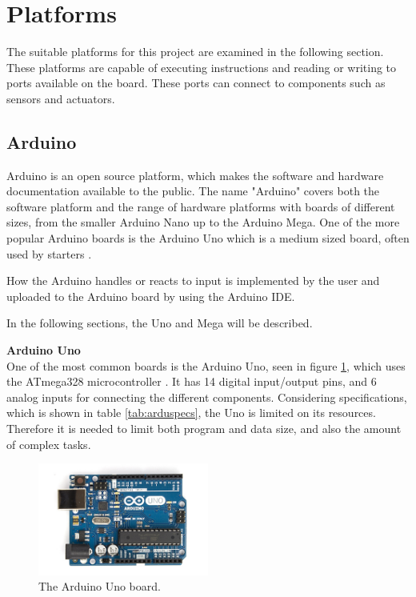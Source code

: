 \section{Platforms}
The suitable platforms for this project are examined in the following section. These platforms are capable of executing instructions and reading or writing to ports available on the board. These ports can connect to components such as sensors and actuators.

\subsection{Arduino}\label{sec:arduino}
Arduino is an open source platform, which makes the software and hardware documentation available to the public. The name "Arduino" covers both the software platform and the range of hardware platforms with boards of different sizes, from the smaller Arduino Nano up to the Arduino Mega. One of the more popular Arduino boards is the Arduino Uno which is a medium sized board, often used by starters \cite{arduinouno}.

How the Arduino handles or reacts to input is implemented by the user and uploaded to the Arduino board by using the Arduino IDE.

In the following sections, the Uno and Mega will be described.

\textbf{Arduino Uno}\\
One of the most common boards is the Arduino Uno, seen in figure \ref{fig:arduinouno}, which uses the ATmega328 microcontroller \cite{arduinouno}. It has 14 digital input/output pins, and 6 analog inputs for connecting the different components. Considering specifications, which is shown in table \ref{tab:arduspecs}, the Uno is limited on its resources. Therefore it is needed to limit both program and data size, and also the amount of complex tasks.

\begin{figure}[h!]
\centering
\includegraphics[width=0.5\textwidth]{chapters/analysis/figs/ArduinoUno.jpg}
\caption{The Arduino Uno board\cite{arduinointroduction}.}
\label{fig:arduinouno}
\end{figure}

